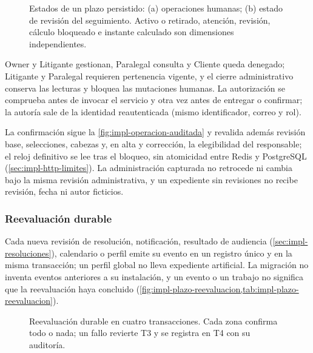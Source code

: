 \begin{figure}[tbp]
  \centering
  
  \caption{Estados de un plazo persistido: (a) operaciones humanas; (b) estado de revisión del seguimiento. Activo o retirado, atención, revisión, cálculo bloqueado e instante calculado son dimensiones independientes.}
  \label{fig:impl-plazo-estados}
\end{figure}

Owner y Litigante gestionan, Paralegal consulta y Cliente queda denegado; Litigante y Paralegal requieren pertenencia vigente, y el cierre administrativo conserva las lecturas y bloquea las mutaciones humanas. La autorización se comprueba antes de invocar el servicio y otra vez antes de entregar o confirmar; la autoría sale de la identidad reautenticada (mismo identificador, correo y rol).

La confirmación sigue la \cref{fig:impl-operacion-auditada} y revalida además revisión base, selecciones, cabezas y, en alta y corrección, la elegibilidad del responsable; el reloj definitivo se lee tras el bloqueo, sin atomicidad entre Redis y PostgreSQL (\cref{sec:impl-http-limites}). La administración capturada no retrocede ni cambia bajo la misma revisión administrativa, y un expediente sin revisiones no recibe revisión, fecha ni autor ficticios.

\subsubsection{Reevaluación durable}

Cada nueva revisión de resolución, notificación, resultado de audiencia (\cref{sec:impl-resoluciones}), calendario o perfil emite su evento en un registro único y en la misma transacción; un perfil global no lleva expediente artificial. La migración no inventa eventos anteriores a su instalación, y un evento o un trabajo no significa que la reevaluación haya concluido (\cref{fig:impl-plazo-reevaluacion,tab:impl-plazo-reevaluacion}).

\begin{figure}[tbp]
  \centering
  
  \caption{Reevaluación durable en cuatro transacciones. Cada zona confirma todo o nada; un fallo revierte T3 y se registra en T4 con su auditoría.}
  \label{fig:impl-plazo-reevaluacion}
\end{figure}

